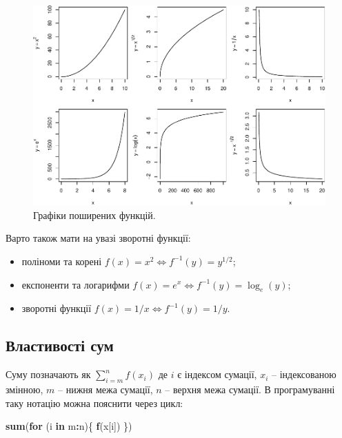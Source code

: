 \documentclass[
  11pt,
]{book}
\newenvironment{Shaded}{\begin{snugshade}}{\end{snugshade}}
\newcommand{\ControlFlowTok}[1]{\textcolor[rgb]{0.13,0.29,0.53}{\textbf{#1}}}
\newcommand{\FunctionTok}[1]{\textcolor[rgb]{0.13,0.29,0.53}{\textbf{#1}}}
\newcommand{\NormalTok}[1]{#1}
\newcommand{\SpecialCharTok}[1]{\textcolor[rgb]{0.81,0.36,0.00}{\textbf{#1}}}
\providecommand{\tightlist}{%
  \setlength{\itemsep}{0pt}\setlength{\parskip}{0pt}}
\begin{document}
\begin{figure}
\centering
\includegraphics{bookdown-demo_files/figure-latex/fig-3-3-1.pdf}
\caption{Графіки поширених функцій.}
\end{figure}

Варто також мати на увазі зворотні функції:

\begin{itemize}
\tightlist
\item
  поліноми та корені \(f(x) = x^2 \iff f^{-1}(y) = y^{1/2}\);
\item
  експоненти та логарифми \(f(x) = e^x \iff f^{-1}(y) = \log_e(y)\);
\item
  зворотні функції \(f(x) = 1/x \iff f^{-1}(y) = 1/y\).
\end{itemize}

\subsection{Властивості
сум}\label{ux432ux43bux430ux441ux442ux438ux432ux43eux441ux442ux456-ux441ux443ux43c}

Суму позначають як \(\sum\limits_{i=m}^{n}f(x_i)\) де \(i\) є індексом
сумації, \(x_i\) -- індексованою змінною, \(m\) -- нижня межа сумації,
\(n\) -- верхня межа сумації. В програмуванні таку нотацію можна
пояснити через цикл:

\begin{Shaded}
\begin{Highlighting}[]
\FunctionTok{sum}\NormalTok{(}\ControlFlowTok{for}\NormalTok{ (i }\ControlFlowTok{in}\NormalTok{ m}\SpecialCharTok{:}\NormalTok{n)\{}
  \FunctionTok{f}\NormalTok{(x[i])}
\NormalTok{\})}
\end{Highlighting}
\end{Shaded}
\end{document}
